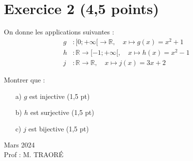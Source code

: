 \documentclass[a4paper,12pt]{article}
\begin{document}
\vspace{0.5cm}

\section*{Exercice 2 \hfill (4,5 points)}

On donne les applications suivantes :
\[
\begin{aligned}
g &: [0 ; +\infty[ \to \mathbb{R},\quad x \mapsto g(x) = x^2 + 1 \\
h &: \mathbb{R} \to [-1 ; +\infty[, \quad x \mapsto h(x) = x^2 - 1 \\
j &: \mathbb{R} \to \mathbb{R},\quad x \mapsto j(x) = 3x + 2
\end{aligned}
\]

Montrer que :
\begin{itemize}
    \item[a)] \( g \) est injective \hfill (1,5 pt)
    \item[b)] \( h \) est surjective \hfill (1,5 pt)
    \item[c)] \( j \) est bijective \hfill (1,5 pt)
\end{itemize}

\vfill

\begin{flushright}
Mars 2024 \\
Prof : M. TRAORÉ
\end{flushright}
\end{document}
